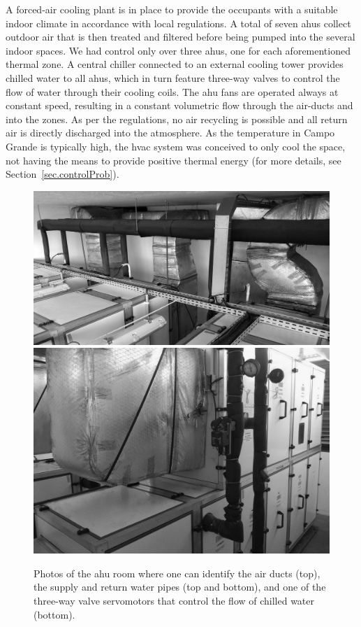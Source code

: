 A forced-air cooling plant is in place to provide the occupants with a suitable indoor climate in accordance with local regulations. A total of seven \acp{ahu} collect outdoor air that is then treated and filtered before being pumped into the several indoor spaces. We had control only over three \acp{ahu}, one for each aforementioned thermal zone. A central chiller connected to an external cooling tower provides chilled water to all \acp{ahu}, which in turn feature three-way valves to control the flow of water through their cooling coils. The \ac{ahu} fans are operated always at constant speed, resulting in a constant volumetric flow through the air-ducts and into the zones. As per the regulations, no air recycling is possible and all return air is directly discharged into the atmosphere. As the temperature in Campo Grande is typically high, the \ac{hvac} system was conceived to only cool the space, not having the means to provide positive thermal energy (for more details, see Section~\ref{sec.controlProb}).

\begin{figure}[!t]
	\centering
	\includegraphics[width=0.75\linewidth]{../images/chap3_ahus_b.jpg} \\[8pt]
	\includegraphics[width=0.75\linewidth]{../images/chap3_ahus_a.jpg} 
	\caption{Photos of the \ac{ahu} room where one can identify the air ducts (top), the supply and return water pipes (top and bottom), and one of the three-way valve servomotors that control the flow of chilled water (bottom).}
	\label{fig.ahuRoom}
\end{figure}


